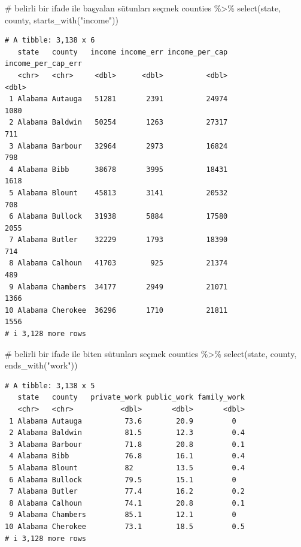 \documentclass[
  letterpaper,
  DIV=11,
  numbers=noendperiod]{scrreprt}
\newenvironment{Shaded}{\begin{snugshade}}{\end{snugshade}}
\newcommand{\CommentTok}[1]{\textcolor[rgb]{0.37,0.37,0.37}{#1}}
\newcommand{\FunctionTok}[1]{\textcolor[rgb]{0.28,0.35,0.67}{#1}}
\newcommand{\NormalTok}[1]{\textcolor[rgb]{0.00,0.23,0.31}{#1}}
\newcommand{\SpecialCharTok}[1]{\textcolor[rgb]{0.37,0.37,0.37}{#1}}
\newcommand{\StringTok}[1]{\textcolor[rgb]{0.13,0.47,0.30}{#1}}
\begin{document}
\begin{Shaded}
\begin{Highlighting}[]
\CommentTok{\# belirli bir ifade ile başyalan sütunları seçmek}
\NormalTok{counties }\SpecialCharTok{\%\textgreater{}\%}
\FunctionTok{select}\NormalTok{(state, county, }\FunctionTok{starts\_with}\NormalTok{(}\StringTok{"income"}\NormalTok{))}
\end{Highlighting}
\end{Shaded}

\begin{verbatim}
# A tibble: 3,138 x 6
   state   county   income income_err income_per_cap income_per_cap_err
   <chr>   <chr>     <dbl>      <dbl>          <dbl>              <dbl>
 1 Alabama Autauga   51281       2391          24974               1080
 2 Alabama Baldwin   50254       1263          27317                711
 3 Alabama Barbour   32964       2973          16824                798
 4 Alabama Bibb      38678       3995          18431               1618
 5 Alabama Blount    45813       3141          20532                708
 6 Alabama Bullock   31938       5884          17580               2055
 7 Alabama Butler    32229       1793          18390                714
 8 Alabama Calhoun   41703        925          21374                489
 9 Alabama Chambers  34177       2949          21071               1366
10 Alabama Cherokee  36296       1710          21811               1556
# i 3,128 more rows
\end{verbatim}

\begin{Shaded}
\begin{Highlighting}[]
\CommentTok{\# belirli bir ifade ile biten sütunları seçmek}
\NormalTok{counties }\SpecialCharTok{\%\textgreater{}\%}
\FunctionTok{select}\NormalTok{(state, county, }\FunctionTok{ends\_with}\NormalTok{(}\StringTok{"work"}\NormalTok{))}
\end{Highlighting}
\end{Shaded}

\begin{verbatim}
# A tibble: 3,138 x 5
   state   county   private_work public_work family_work
   <chr>   <chr>           <dbl>       <dbl>       <dbl>
 1 Alabama Autauga          73.6        20.9         0  
 2 Alabama Baldwin          81.5        12.3         0.4
 3 Alabama Barbour          71.8        20.8         0.1
 4 Alabama Bibb             76.8        16.1         0.4
 5 Alabama Blount           82          13.5         0.4
 6 Alabama Bullock          79.5        15.1         0  
 7 Alabama Butler           77.4        16.2         0.2
 8 Alabama Calhoun          74.1        20.8         0.1
 9 Alabama Chambers         85.1        12.1         0  
10 Alabama Cherokee         73.1        18.5         0.5
# i 3,128 more rows
\end{verbatim}
\end{document}
